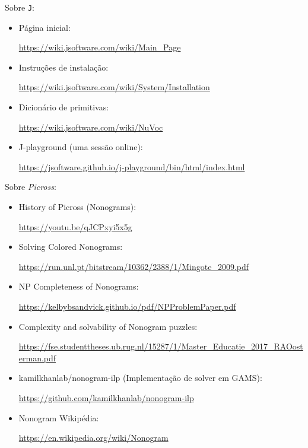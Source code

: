 \documentclass{article}
\newcommand{\lang}{\texttt{J}}
\begin{document}
\noindent
Sobre \lang{}:
\begin{itemize}
    \item Página inicial: \par
        \url{https://wiki.jsoftware.com/wiki/Main_Page}
    \item Instruções de instalação: \par
        \url{https://wiki.jsoftware.com/wiki/System/Installation}
    \item Dicionário de primitivas: \par
        \url{https://wiki.jsoftware.com/wiki/NuVoc}
    \item J-playground (uma sessão online): \par
        \url{https://jsoftware.github.io/j-playground/bin/html/index.html}
\end{itemize}

\noindent
Sobre \emph{Picross}:
\begin{itemize}
    \item History of Picross (Nonograms): \par
        \url{https://youtu.be/qJCPxyi5x5g}
    \item Solving Colored Nonograms: \par
        \url{https://run.unl.pt/bitstream/10362/2388/1/Mingote_2009.pdf}
    \item NP Completeness of Nonograms: \par
        \url{https://kelbybsandvick.github.io/pdf/NPProblemPaper.pdf}
    \item Complexity and solvability of Nonogram puzzles: \par
        \url{https://fse.studenttheses.ub.rug.nl/15287/1/Master_Educatie_2017_RAOosterman.pdf}
    \item kamilkhanlab/nonogram-ilp
        (Implementação de solver em GAMS): \par
        \url{https://github.com/kamilkhanlab/nonogram-ilp}
    \item Nonogram Wikipédia: \par
        \url{https://en.wikipedia.org/wiki/Nonogram}
\end{itemize}
\end{document}
